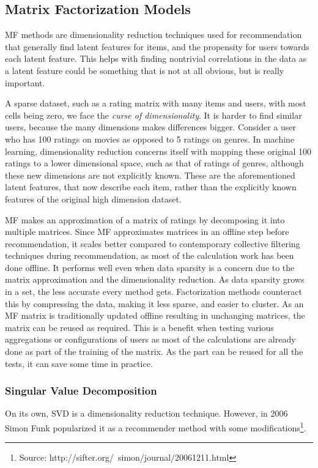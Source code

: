 \subsection{Matrix Factorization Models} \label{bg:sub:factorizationmodels}
MF methods are dimensionality reduction techniques used for recommendation that generally find latent features for items, and the propensity for users towards each latent feature. This helps with finding nontrivial correlations in the data as a latent feature could be something that is not at all obvious, but is really important.

A sparse dataset, such as a rating matrix with many items and users, with most cells being zero, we face the \textit{curse of dimensionality}. It is harder to find similar users, because the many dimensions makes differences bigger. Consider a user who has 100 ratings on movies as opposed to 5 ratings on genres. In machine learning, dimensionality reduction concerns itself with mapping these original 100 ratings to a lower dimensional space, such as that of ratings of genres, although these new dimensions are not explicitly known. These are the aforementioned latent features, that now describe each item, rather than the explicitly known features of the original high dimension dataset\cite{recsys_dimensionalityreduction}.

MF makes an approximation of a matrix of ratings by decomposing it into multiple matrices. Since MF approximates matrices in an offline step before recommendation, it scales better compared to contemporary collective filtering techniques during recommendation, as most of the calculation work has been done offline. It performs well even when data sparsity is a concern due to the matrix approximation and the dimensionality reduction.
As data sparsity grows in a set, the less accurate every method gets. Factorization methods counteract this by compressing the data, making it less sparse, and easier to cluster.
As an MF matrix is traditionally updated offline resulting in unchanging matrices, the matrix can be reused as required. This is a benefit when testing various aggregations or configurations of users as most of the calculations are already done as part of the training of the matrix. As the part can be reused for all the tests, it can save some time in practice.

\subsubsection{Singular Value Decomposition}
On its own, SVD is a dimensionality reduction technique. However, in 2006 Simon Funk popularized it as a recommender method with some modifications\footnote{Source: http://sifter.org/~simon/journal/20061211.html}\cite{svdsimonfunk}.

